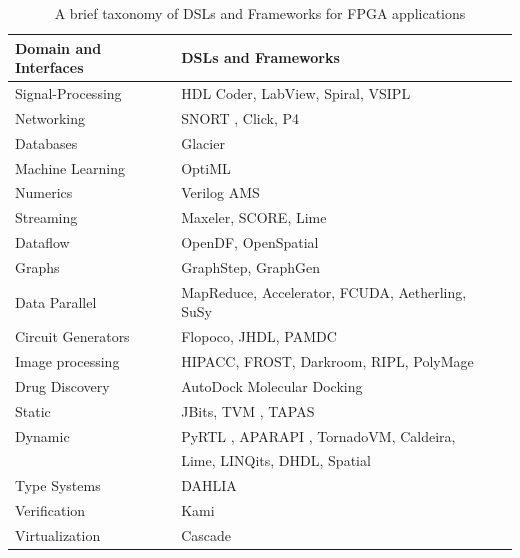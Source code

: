 \begin {table} [h]
	\begin{center}
		\caption { A brief taxonomy of DSLs and Frameworks for FPGA applications}
		\begin{tabular}{ | l | l | l | p{0.1cm}|}
			\hline
			\textbf{Domain and Interfaces} &  \textbf{DSLs and Frameworks} \\ \hline  
			Signal-Processing &  HDL Coder, LabView, Spiral, VSIPL  \\            \hline
			Networking  &  SNORT \cite{snort}, Click, P4\\            \hline
			Databases & Glacier  \\ \hline
			Machine Learning & OptiML  \\ \hline 
			Numerics &Verilog
			AMS   \\            \hline
			Streaming & Maxeler, SCORE, Lime  \\            \hline
			Dataflow & OpenDF, OpenSpatial  \\            \hline
			Graphs & GraphStep, GraphGen  \\            \hline
			Data Parallel & MapReduce, Accelerator, FCUDA, Aetherling, SuSy  \\            \hline
			Circuit Generators & Flopoco, JHDL, PAMDC  \\            \hline
			Image processing & HIPACC, FROST, Darkroom, RIPL, PolyMage \\            \hline
			Drug Discovery & AutoDock Molecular Docking \\            \hline
 			Static &  JBits, TVM \cite{tvm}, TAPAS \\            \hline
				Dynamic &  PyRTL \cite{pyrtl}, APARAPI \cite{arapa}, TornadoVM\cite{tornado}, Caldeira, \\ & Lime,
		LINQits, DHDL, Spatial \\            \hline
		Type Systems & DAHLIA \\ \hline
		Verification & Kami \\ \hline
		Virtualization & Cascade \\ \hline
		\end{tabular}
	\end{center}
	\end {table}
 



